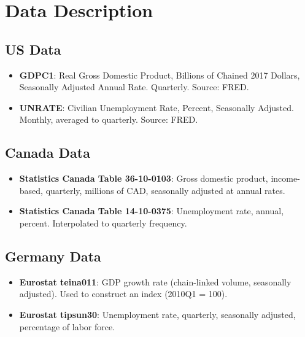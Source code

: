 \documentclass[12pt,a4paper]{article}
\begin{document}
\newpage

\appendix

\section{Data Description}

\subsection{US Data}

\begin{itemize}
    \item \textbf{GDPC1}: Real Gross Domestic Product, Billions of Chained 2017 Dollars, Seasonally Adjusted Annual Rate. Quarterly. Source: FRED.
    \item \textbf{UNRATE}: Civilian Unemployment Rate, Percent, Seasonally Adjusted. Monthly, averaged to quarterly. Source: FRED.
\end{itemize}

\subsection{Canada Data}

\begin{itemize}
    \item \textbf{Statistics Canada Table 36-10-0103}: Gross domestic product, income-based, quarterly, millions of CAD, seasonally adjusted at annual rates.
    \item \textbf{Statistics Canada Table 14-10-0375}: Unemployment rate, annual, percent. Interpolated to quarterly frequency.
\end{itemize}

\subsection{Germany Data}

\begin{itemize}
    \item \textbf{Eurostat teina011}: GDP growth rate (chain-linked volume, seasonally adjusted). Used to construct an index (2010Q1 = 100).
    \item \textbf{Eurostat tipsun30}: Unemployment rate, quarterly, seasonally adjusted, percentage of labor force.
\end{itemize}
\end{document}
